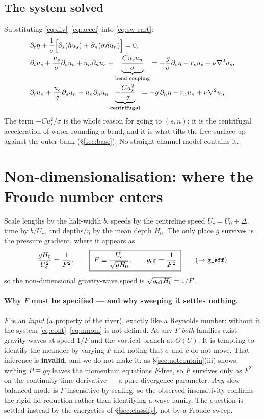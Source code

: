 \documentclass[11pt]{article}
\newcommand{\us}{u_s}
\newcommand{\un}{u_n}
\newcommand{\ds}{\partial_s}
\newcommand{\dn}{\partial_n}
\newcommand{\dt}{\partial_t}
\newcommand{\code}[1]{\texttt{\small #1}}
\begin{document}
\subsection{The system solved}
Substituting \eqref{eq:div}--\eqref{eq:accel} into \eqref{eq:sw-cart}:
\begin{align}
  &\dt\eta+\frac{1}{\sigma}\Big[\ds(h\us)+\dn(\sigma h\un)\Big]=0,
  \label{eq:cont}\\
  &\dt \us+\frac{\us}{\sigma}\ds \us+\un\dn \us
   +\underbrace{\frac{C\us\un}{\sigma}}_{\text{bend coupling}}
   =-\frac{g}{\sigma}\ds\eta-r_s\us+\nu\nabla^2\us,
  \label{eq:smom}\\
  &\dt \un+\frac{\us}{\sigma}\ds \un+\un\dn \un
   \underbrace{-\frac{C\us^{2}}{\sigma}}_{\text{\bf centrifugal}}
   =-g\,\dn\eta-r_n\un+\nu\nabla^2\un.
  \label{eq:nmom}
\end{align}
The term $-C\us^2/\sigma$ is the whole reason for going to $(s,n)$: it is the
centrifugal acceleration of water rounding a bend, and it is what tilts the free
surface up against the outer bank (\S\ref{sec:base}). No straight-channel model
contains it.

\section{Non-dimensionalisation: where the Froude number enters}
\label{sec:nondim}

Scale lengths by the half-width $b$, speeds by the centreline speed
$U_c=U_0+\Delta$, time by $b/U_c$, and depths/$\eta$ by the mean depth $H_0$.
The only place $g$ survives is the pressure gradient, where it appears as
\begin{equation}
  \frac{gH_0}{U_c^{2}}=\frac{1}{F^{2}},\qquad
  \boxed{\;F\equiv\frac{U_c}{\sqrt{gH_0}},\qquad g_{\rm eff}=\frac1{F^{2}}\;}
  \tag{$\to$ \code{g\_eff}}
\end{equation}
so the non-dimensional gravity-wave speed is $\sqrt{g_{\rm eff}H_0}=1/F$.

\paragraph{Why $F$ must be specified --- and why sweeping it settles nothing.}
$F$ is an \emph{input} (a property of the river), exactly like a Reynolds number:
without it the system \eqref{eq:cont}--\eqref{eq:nmom} is not defined. At any $F$
\emph{both} families exist --- gravity waves at speed $1/F$ and the vortical
branch at $O(U)$. It is tempting to identify the meander by varying $F$ and noting
that $\sigma$ and $c$ do not move. That inference is \textbf{invalid}, and we do not
make it: as \S\ref{sec:notcontain}(iii) shows, writing $P\equiv g\eta$ leaves the
momentum equations $F$-free, so $F$ survives only as $F^{2}$ on the continuity
time-derivative --- a pure divergence parameter. \emph{Any} slow balanced mode is
$F$-insensitive by scaling, so the observed insensitivity confirms the rigid-lid
reduction rather than identifying a wave family. The question is settled instead by
the energetics of \S\ref{sec:classify}, not by a Froude sweep.
\end{document}
